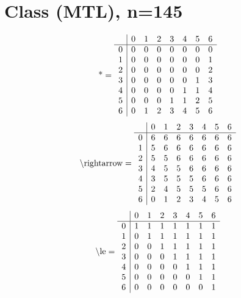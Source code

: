 \documentclass[11pt]{article}
\begin{document}
\section{Class (MTL), n=145}
\[\text{*} = 
\begin{array}{r | r r r r r r r}
 & 0 & 1 & 2 & 3 & 4 & 5 & 6 \\ \hline
0 & 0 & 0 & 0 & 0 & 0 & 0 & 0 \\
1 & 0 & 0 & 0 & 0 & 0 & 0 & 1 \\
2 & 0 & 0 & 0 & 0 & 0 & 0 & 2 \\
3 & 0 & 0 & 0 & 0 & 0 & 1 & 3 \\
4 & 0 & 0 & 0 & 0 & 1 & 1 & 4 \\
5 & 0 & 0 & 0 & 1 & 1 & 2 & 5 \\
6 & 0 & 1 & 2 & 3 & 4 & 5 & 6 \\
\end{array}
\]
\[\text{\textbackslash rightarrow} = 
\begin{array}{r | r r r r r r r}
 & 0 & 1 & 2 & 3 & 4 & 5 & 6 \\ \hline
0 & 6 & 6 & 6 & 6 & 6 & 6 & 6 \\
1 & 5 & 6 & 6 & 6 & 6 & 6 & 6 \\
2 & 5 & 5 & 6 & 6 & 6 & 6 & 6 \\
3 & 4 & 5 & 5 & 6 & 6 & 6 & 6 \\
4 & 3 & 5 & 5 & 5 & 6 & 6 & 6 \\
5 & 2 & 4 & 5 & 5 & 5 & 6 & 6 \\
6 & 0 & 1 & 2 & 3 & 4 & 5 & 6 \\
\end{array}
\]
\[\text{\textbackslash le} = 
\begin{array}{r | r r r r r r r}
 & 0 & 1 & 2 & 3 & 4 & 5 & 6 \\ \hline
0 & 1 & 1 & 1 & 1 & 1 & 1 & 1 \\
1 & 0 & 1 & 1 & 1 & 1 & 1 & 1 \\
2 & 0 & 0 & 1 & 1 & 1 & 1 & 1 \\
3 & 0 & 0 & 0 & 1 & 1 & 1 & 1 \\
4 & 0 & 0 & 0 & 0 & 1 & 1 & 1 \\
5 & 0 & 0 & 0 & 0 & 0 & 1 & 1 \\
6 & 0 & 0 & 0 & 0 & 0 & 0 & 1 \\
\end{array}
\]
\end{document}
